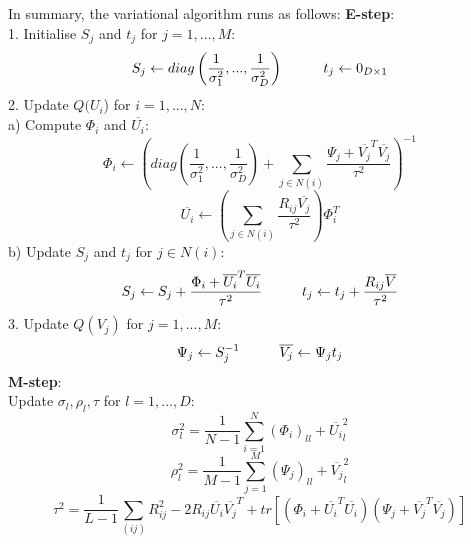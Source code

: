 \documentclass{article}
\theoremstyle{plain}
\begin{document}
In summary, the variational algorithm runs as follows:
\newpage
\textbf{E-step}: \\
1. Initialise $S_j$ and $t_j$ for $j=1,...,M$:
\begin{equation}
S_j \leftarrow diag\left(\frac{1}{\sigma_1^2} , ... , \frac{1}{\sigma_D^2}\right) \hspace{10 mm} t_j \leftarrow 0_{D \times 1}
\end{equation}
2. Update $Q(U_i$) for $i=1,...,N$: \\
   a) Compute $\Phi_i$ and $\overline{U_i}$:
\begin{equation}
\Phi_i \leftarrow \left(diag\left(\frac{1}{\sigma_1^2} , ... , \frac{1}{\sigma_D^2}\right)+\sum_{j \in N(i)} \frac{\Psi_j+\overline{V_j}^T\overline{V_j}}{\tau^2}\right)^{-1}
\end{equation}
\begin{equation}
\overline{U_i} \leftarrow \left(\sum_{j\in N(i)} \frac{R_{ij}\overline{V_j}}{\tau^2} \right)\Phi_i^T
\end{equation}
   b) Update $S_j$ and $t_j$ for $j \in N(i)$:
\begin{equation}
S_j \leftarrow S_j+\frac{\Phi_i+\overline{U_i}^T\overline{U_i}}{\tau^2} \hspace{10 mm} t_j \leftarrow t_j+\frac{R_{ij}\overline{V}}{\tau^2}
\end{equation}
3. Update $Q(V_j)$ for $j=1,...,M$:
\begin{equation}
\Psi_j \leftarrow S_j^{-1} \hspace{10mm} \overline{V_j} \leftarrow \Psi_j t_j
\end{equation}
\textbf{M-step}: \\
Update $\sigma_l,\rho_l,\tau$ for $l=1,...,D$:
\begin{equation}
\sigma_l^2=\frac{1}{N-1}\sum_{i=1}^N (\Phi_i)_{ll}+\overline{U_i}_l^2 
\end{equation}
\begin{equation}
\rho_l^2=\frac{1}{M-1}\sum_{j=1}^M (\Psi_j)_{ll}+\overline{V_j}_l^2
\end{equation}
\begin{equation}
\tau^2=\frac{1}{L-1}\sum_{(ij)} R_{ij}^2-2R_{ij}\overline{U_i}\overline{V_j}^T+tr[(\Phi_i+\overline{U_i}^T\overline{U_i})(\Psi_j+\overline{V_j}^T\overline{V_j})]
\end{equation}
\end{document}
